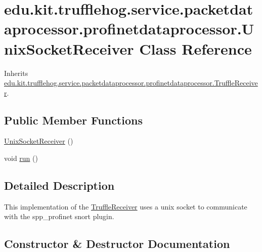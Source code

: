 \hypertarget{classedu_1_1kit_1_1trufflehog_1_1service_1_1packetdataprocessor_1_1profinetdataprocessor_1_1_unix_socket_receiver}{}\section{edu.\+kit.\+trufflehog.\+service.\+packetdataprocessor.\+profinetdataprocessor.\+Unix\+Socket\+Receiver Class Reference}
\label{classedu_1_1kit_1_1trufflehog_1_1service_1_1packetdataprocessor_1_1profinetdataprocessor_1_1_unix_socket_receiver}


Inherits \hyperlink{classedu_1_1kit_1_1trufflehog_1_1service_1_1packetdataprocessor_1_1profinetdataprocessor_1_1_truffle_receiver}{edu.\+kit.\+trufflehog.\+service.\+packetdataprocessor.\+profinetdataprocessor.\+Truffle\+Receiver}.

\subsection*{Public Member Functions}
\begin{DoxyCompactItemize}
\item 
\hyperlink{classedu_1_1kit_1_1trufflehog_1_1service_1_1packetdataprocessor_1_1profinetdataprocessor_1_1_unix_socket_receiver_a7341a8ebee2d3d32cfa46a54401a8c85}{Unix\+Socket\+Receiver} ()
\item 
void \hyperlink{classedu_1_1kit_1_1trufflehog_1_1service_1_1packetdataprocessor_1_1profinetdataprocessor_1_1_unix_socket_receiver_a47c3e55796789b4ee88b34488289709a}{run} ()
\end{DoxyCompactItemize}


\subsection{Detailed Description}
This implementation of the \hyperlink{classedu_1_1kit_1_1trufflehog_1_1service_1_1packetdataprocessor_1_1profinetdataprocessor_1_1_truffle_receiver}{Truffle\+Receiver} uses a unix socket to communicate with the spp\+\_\+profinet snort plugin. 

\subsection{Constructor \& Destructor Documentation}
\hypertarget{classedu_1_1kit_1_1trufflehog_1_1service_1_1packetdataprocessor_1_1profinetdataprocessor_1_1_unix_socket_receiver_a7341a8ebee2d3d32cfa46a54401a8c85}{}
